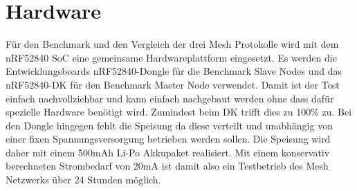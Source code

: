 	\clearpage
\section{Hardware}\label{sec:Hardware}



Für den Benchmark und den Vergleich der drei Mesh Protokolle wird mit dem nRF52840 SoC eine gemeinsame Hardwareplattform eingesetzt. Es werden die Entwicklungsboards nRF52840-Dongle für die Benchmark Slave Nodes und das nRF52840-DK für den Benchmark Master Node verwendet. Damit ist der Test einfach nachvollziehbar und kann einfach nachgebaut werden ohne dass dafür spezielle Hardware benötigt wird. Zumindest beim DK trifft dies zu 100\% zu. Bei den Dongle hingegen fehlt die Speisung da diese verteilt und unabhängig von einer fixen Spannungsversorgung betrieben werden sollen. Die Speisung wird daher mit einem 500mAh Li-Po Akkupaket realisiert. Mit einem konservativ berechneten Strombedarf von 20mA ist damit also ein Testbetrieb des Mesh Netzwerks über 24 Stunden möglich.

